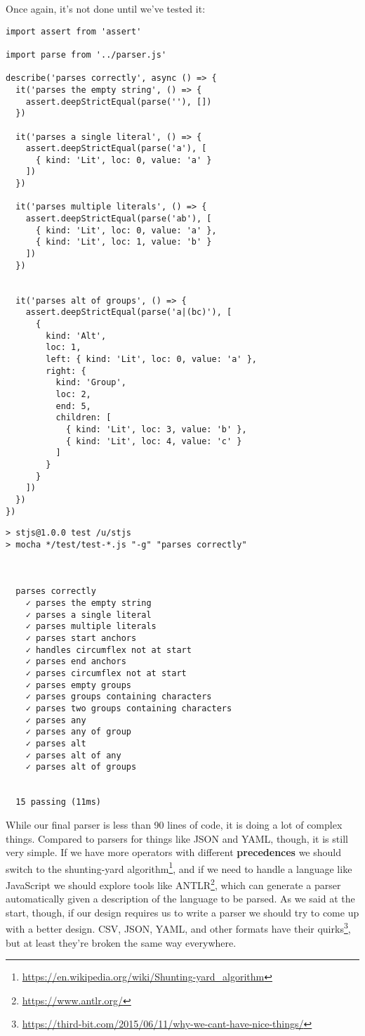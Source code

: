 \documentclass[krantzl]{krantz}
\newcommand{\glossref}[1]{\textbf{#1}}
\newcommand{\hreffoot}[2]{{#1}\footnote{\href{#2}{#2}}}
\begin{document}
Once again,
it’s not done until we’ve tested it:


\begin{lstlisting}[frame=tblr]
import assert from 'assert'

import parse from '../parser.js'

describe('parses correctly', async () => {
  it('parses the empty string', () => {
    assert.deepStrictEqual(parse(''), [])
  })

  it('parses a single literal', () => {
    assert.deepStrictEqual(parse('a'), [
      { kind: 'Lit', loc: 0, value: 'a' }
    ])
  })

  it('parses multiple literals', () => {
    assert.deepStrictEqual(parse('ab'), [
      { kind: 'Lit', loc: 0, value: 'a' },
      { kind: 'Lit', loc: 1, value: 'b' }
    ])
  })


  it('parses alt of groups', () => {
    assert.deepStrictEqual(parse('a|(bc)'), [
      {
        kind: 'Alt',
        loc: 1,
        left: { kind: 'Lit', loc: 0, value: 'a' },
        right: {
          kind: 'Group',
          loc: 2,
          end: 5,
          children: [
            { kind: 'Lit', loc: 3, value: 'b' },
            { kind: 'Lit', loc: 4, value: 'c' }
          ]
        }
      }
    ])
  })
})
\end{lstlisting}



\begin{lstlisting}[frame=tblr,backgroundcolor=\color{black!5}]
> stjs@1.0.0 test /u/stjs
> mocha */test/test-*.js "-g" "parses correctly"



  parses correctly
    ✓ parses the empty string
    ✓ parses a single literal
    ✓ parses multiple literals
    ✓ parses start anchors
    ✓ handles circumflex not at start
    ✓ parses end anchors
    ✓ parses circumflex not at start
    ✓ parses empty groups
    ✓ parses groups containing characters
    ✓ parses two groups containing characters
    ✓ parses any
    ✓ parses any of group
    ✓ parses alt
    ✓ parses alt of any
    ✓ parses alt of groups


  15 passing (11ms)
\end{lstlisting}



While our final parser is less than 90 lines of code,
it is doing a lot of complex things.
Compared to parsers for things like JSON and YAML,
though,
it is still very simple.
If we have more operators with different \glossref{precedences}
we should switch to the \hreffoot{shunting-yard algorithm}{https://en.wikipedia.org/wiki/Shunting-yard\_algorithm},
and if we need to handle a language like JavaScript we should explore tools like \hreffoot{ANTLR}{https://www.antlr.org/},
which can generate a parser automatically given a description of the language to be parsed.
As we said at the start,
though,
if our design requires us to write a parser we should try to come up with a better design.
CSV, JSON, YAML, and other formats \hreffoot{have their quirks}{https://third-bit.com/2015/06/11/why-we-cant-have-nice-things/},
but at least they’re broken the same way everywhere.
\end{document}
